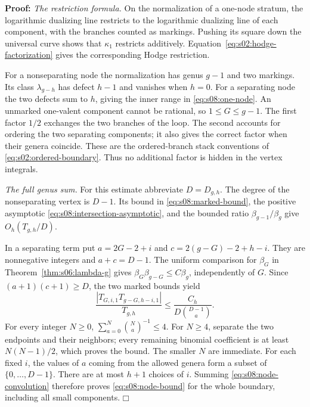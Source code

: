\documentclass[a4paper,10pt]{article}
\numberwithin{equation}{section}
\theoremstyle{paperplain}
\theoremstyle{paperremark}
\theoremstyle{paperplain}
\newenvironment{prf}{\noindent \textbf{Proof: }}{\hfill $\mdlgwhtsquare$\par\addvspace{0.5\baselineskip}}
\begin{document}
\begin{prf}
\emph{The restriction formula.}
On the normalization of a one-node stratum, the logarithmic
dualizing line restricts to the logarithmic dualizing line of each
component, with the branches counted as markings. Pushing its
square down the universal curve shows that $\kappa_1$ restricts
additively. Equation~\eqref{eq:s02:hodge-factorization} gives the
corresponding Hodge restriction.

For a nonseparating node the normalization has genus $g-1$ and two
markings. Its class $\lambda_{g-h}$ has defect $h-1$ and vanishes
when $h=0$. For a separating node the two defects sum to $h$,
giving the inner range in \eqref{eq:s08:one-node}. An unmarked
one-valent component cannot be rational, so $1\leq G\leq g-1$.
The first factor $1/2$ exchanges the two branches of the loop.
The second accounts for ordering the two separating components;
it also gives the correct factor when their genera coincide.
These are the ordered-branch stack conventions of
\eqref{eq:s02:ordered-boundary}. Thus no additional factor is
hidden in the vertex integrals.

\smallskip\noindent
\emph{The full genus sum.}
For this estimate abbreviate $D=D_{g,h}$. The degree of the
nonseparating vertex is $D-1$. Its bound in
\eqref{eq:s08:marked-bound}, the positive asymptotic
\eqref{eq:s08:intersection-asymptotic}, and the bounded ratio
$\beta_{g-1}/\beta_g$ give $O_h(T_{g,h}/D)$.

In a separating term put
$a=2G-2+i$ and $c=2(g-G)-2+h-i$. They are nonnegative integers
and $a+c=D-1$. The uniform comparison for $\beta_G$ in
Theorem~\ref{thm:s06:lambda-g} gives
$\beta_G\beta_{g-G}\leq C\beta_g$, independently of $G$.
Since $(a+1)(c+1)\geq D$, the two marked bounds yield
\begin{equation}\label{eq:s08:node-convolution}
 \frac{|T_{G,i,1}T_{g-G,h-i,1}|}{T_{g,h}}
 \leq \frac{C_h}{D\binom{D-1}{a}}.
\end{equation}
For every integer $N\geq0$,
$\sum_{a=0}^N\binom Na^{-1}\leq4$. For $N\geq4$, separate
the two endpoints and their neighbors; every remaining binomial
coefficient is at least $N(N-1)/2$, which proves the bound.
The smaller $N$ are immediate. For each fixed $i$, the values of
$a$ coming from the allowed genera form a subset of
$\{0,\ldots,D-1\}$. There are at most $h+1$ choices of $i$.
Summing \eqref{eq:s08:node-convolution} therefore proves
\eqref{eq:s08:node-bound} for the whole boundary, including all
small components.
\end{prf}
\end{document}
